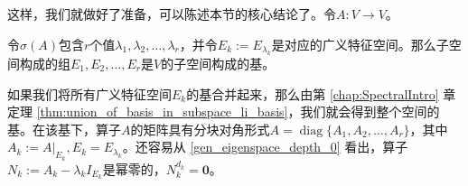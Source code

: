 这样，我们就做好了准备，可以陈述本节的核心结论了。令$A:V\to V$。

\begin{theorem}\label{thm:gen_eigen_decomp}
    令$\sigma(A)$包含$r$个值$\lambda_1,\lambda_2,\dots,\lambda_r$，并令$E_k:=E_{\lambda_k}$是对应的广义特征空间。那么子空间构成的组$E_1,E_2,\dots,E_r$是$V$的子空间构成的基。
\end{theorem}

\begin{remark}\label{remark:gen_eigen_decomp}
    如果我们将所有广义特征空间$E_k$的基合并起来，那么由第 \ref{chap:SpectralIntro} 章定理 \ref{thm:union_of_basis_in_subspace_li_basis}，我们就会得到整个空间的基。在该基下，算子$A$的矩阵具有分块对角形式$A=\operatorname{diag}\{A_1,A_2,\dots,A_r\}$，其中$A_k:=A|_{E_k},E_k=E_{\lambda_k}$。还容易从 \eqref{gen_eigenspace_depth_0} 看出，算子$N_k:=A_k-\lambda_k I_{E_k}$是幂零的，$N_k^{d_k}=\mathbf{0}$。
\end{remark}


